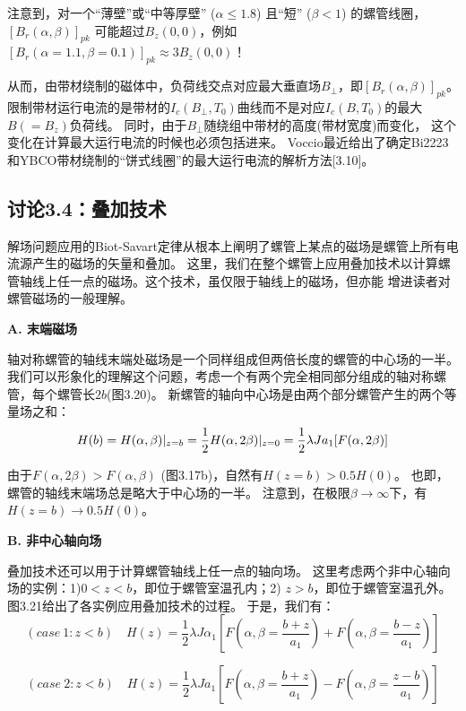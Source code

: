注意到，对一个“薄壁”或“中等厚壁” ($\alpha \le 1.8$) 且“短” ($\beta < 1$) 的螺管线圈，
$[B_r(\alpha,\beta)]_{pk}$ 可能超过$B_z(0, 0)$，例如$[B_r(\alpha=1.1,\beta=0.1)]_{pk}\approx 3B_z(0,0)$！

从而，由带材绕制的磁体中，负荷线交点对应最大垂直场$B_{\perp}$，即$[B_r(\alpha,\beta)]_{pk}$。
限制带材运行电流的是带材的$I_c(B_{\perp},T_0)$曲线而不是对应$I_c(B, T_0)$的最大$B(=B_z)$负荷线。
同时，由于$B_{\perp}$随绕组中带材的高度(带材宽度)而变化，
这个变化在计算最大运行电流的时候也必须包括进来。
Voccio最近给出了确定Bi2223和YBCO带材绕制的“饼式线圈”的最大运行电流的解析方法[3.10]。

\newpage

\subsection{讨论3.4：叠加技术}
解场问题应用的Biot-Savart定律从根本上阐明了螺管上某点的磁场是螺管上所有电流源产生的磁场的矢量和叠加。
这里，我们在整个螺管上应用叠加技术以计算螺管轴线上任一点的磁场。这个技术，虽仅限于轴线上的磁场，但亦能
增进读者对螺管磁场的一般理解。

\textbf{A. 末端磁场}

轴对称螺管的轴线末端处磁场是一个同样组成但两倍长度的螺管的中心场的一半。
我们可以形象化的理解这个问题，考虑一个有两个完全相同部分组成的轴对称螺管，每个螺管长$2b$(图3.20)。
新螺管的轴向中心场是由两个部分螺管产生的两个等量场之和：
\begin{equation}
H(b)=H(\alpha,\beta)|_{z=b}=\frac{1}{2}H(\alpha,2\beta)|_{z=0}=\frac{1}{2}\lambda Ja_{1}[F(\alpha,2\beta)]\\%
\end{equation}

由于$F(\alpha, 2\beta)>F(\alpha,\beta)$ (图3.17b)，自然有$H(z=b)>0.5H(0)$。
也即，螺管的轴线末端场总是略大于中心场的一半。
注意到，在极限$\beta\rightarrow\infty$下，有$H(z=b)\rightarrow 0.5H(0)$。

\textbf{B. 非中心轴向场}

叠加技术还可以用于计算螺管轴线上任一点的轴向场。
这里考虑两个非中心轴向场的实例：1)$0<z<b$，即位于螺管室温孔内；2) $z > b$，即位于螺管室温孔外。
图3.21给出了各实例应用叠加技术的过程。
于是，我们有：
\begin{equation}
(case\ 1:z<b)\quad H(z)=\frac{1}{2}\lambda J\alpha_{1}[F(\alpha,\beta=\frac{b+z}{a_{1}})+F(\alpha,\beta=\frac{b-z}{a_{1}})]%
\end{equation}

\begin{equation}
(case\ 2:z<b)\quad H(z)=\frac{1}{2}\lambda Ja_{1}[F(\alpha,\beta=\frac{b+z}{a_{1}})-F(\alpha,\beta=\frac{z-b}{a_{1}})]%
\end{equation}

